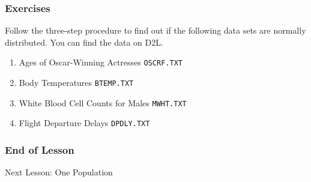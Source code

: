 \documentclass[xcolor=dvipsnames]{beamer}
\begin{document}
\begin{frame}
  \frametitle{Exercises}
  {\ubung} Follow the three-step procedure to find out if the
  following data sets are normally distributed. You can find the
  data on D2L.
  \begin{enumerate}
  \item Ages of Oscar-Winning Actresses \texttt{OSCRF.TXT}
  \item Body Temperatures \texttt{BTEMP.TXT}
  \item White Blood Cell Counts for Males \texttt{MWHT.TXT}
  \item Flight Departure Delays \texttt{DPDLY.TXT}
  \end{enumerate}
\end{frame}

\begin{frame}
  \frametitle{End of Lesson}
Next Lesson: One Population
\end{frame}
\end{document}

